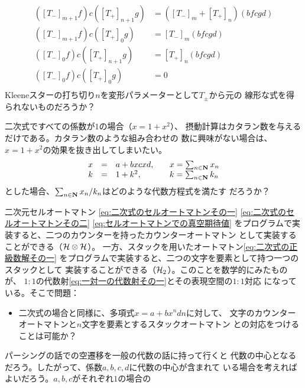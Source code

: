 {\begin{description}
\begin{equation*}
\begin{split}
			([T_-]_{m+1}f)c([T_+]_{n+1}g) &= ([T_-]_m + [T_+]_n)(bfcgd) \\
			([T_-]_{m+1}f)c([T_+]_0g) &= [T_-]_m(bfcgd) \\
			([T_-]_0f)c([T_+]_{n+1}g) &= [T_+]_n(bfcgd) \\
			([T_-]_0f)c([T_+]_0g) &= 0 \\
		\end{split}\end{equation*}
		Kleeneスターの打ち切り$n$を変形パラメーターとして$T_\pm$から元の
		線形な式を得られないものだろうか？
		\item[組み合わせの数] 二次式ですべての係数が$1$の場合（$x=1+x^2$）、
		摂動計算はカタラン数を与えるだけである。カタラン数のような組み合わせの
		数に興味がない場合は、$x=1+x^2$の効果を抜き出してしまいたい。
		\begin{equation*}\begin{array}{rcll}
			x &=& a + bxcxd,&\quad x = \sum_{n\in\mathbf{N}} x_n \\
			k &=& 1 + k^2,&\quad k = \sum_{n\in\mathbf{N}} k_n \\
		\end{array}\end{equation*}
		とした場合、$\sum_{n\in\mathbf{N}}x_n/k_n$はどのような代数方程式を満たす
		だろうか？
		\item[カウンターオートマトン] 二次元セルオートマトン
		\eqref{eq:二次式のセルオートマトンその一}
		\eqref{eq:二次式のセルオートマトンその二}
		\eqref{eq:セルオートマトンでの真空期待値}
		をプログラムで実装すると、二つのカウンターを持ったカウンターオートマトン
		として実装することができる（${{\mathcal{H}}}\otimes{\ensuremath{{\mathcal{H}}}}$）。
		一方、スタックを用いたオートマトン\eqref{eq:二次式の正級数解その一}
		をプログラムで実装すると、二つの文字を要素として持つ一つのスタックとして
		実装することができる（${{\mathcal{H}}}_2$）。このことを数学的にみたものが、
		$1:1$の代数射\eqref{eq:一対一の代数射その一}とその表現空間の$1:1$対応
		になっている。そこで問題：
		\begin{itemize}\setlength{\itemsep}{-1mm} %
			\item 二次式の場合と同様に、多項式$x=a+bx^nd$$n$に対して、
			文字のカウンターオートマトンと$n$文字を要素とするスタックオートマトン
			との対応をつけることは可能か？
		\end{itemize} %
		\item[空遷移] パーシングの話での空遷移を一般の代数の話に持って行くと
		代数の中心となるだろう。したがって、係数$a,b,c,d$に代数の中心が含まれて
		いる場合を考えればよいだろう。$a,b,c$がそれぞれ$1$の場合の

\end{description}}
